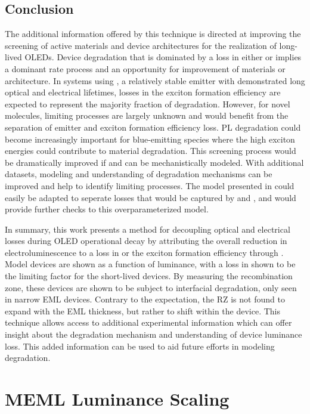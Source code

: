 \documentclass[../thesis.tex]{subfiles}
\begin{document}
\subsection{Conclusion}

The additional information offered by this technique is directed at improving the screening of active materials and device architectures for the realization of long-lived OLEDs.  
Device degradation that is dominated by a loss in either \ef  or \pl implies a dominant rate process and an opportunity for improvement of materials or architecture.  
In systems using \irppy, a relatively stable emitter with demonstrated long optical and electrical lifetimes,\supercite{Scholz2015} losses in the exciton formation efficiency are expected to represent the majority fraction of degradation.  
However, for novel molecules, limiting processes are largely unknown and would benefit from the separation of emitter and exciton formation efficiency loss.  
PL degradation could become increasingly important for blue-emitting species where the high exciton energies could contribute to material degradation.  \supercite{Scholz2015,Xu2016,Coburn2016a,Lee2015,Yi2016,Kim2008}
This screening process would be dramatically improved if \ef and \pl can be mechanistically modeled.  
With additional datasets, modeling and understanding of degradation mechanisms can be improved and help to identify limiting processes.
The model presented in \textcite{Giebink2008a} could easily be adapted to seperate losses that would be captured by \pl and \ef, and would provide further checks to this overparameterized model.

In summary, this work presents a method for decoupling optical and electrical losses during OLED operational decay by attributing the overall reduction in electroluminescence to a loss in \pl or the exciton formation efficiency through \ef.  
Model devices are shown as a function of luminance, with a loss in \ef shown to be the limiting factor for the short-lived devices.  
By measuring the recombination zone, these devices are shown to be subject to interfacial degradation, only seen in narrow EML devices.
Contrary to the expectation, the RZ is not found to expand with the EML thickness, but rather to shift within the device.
This technique allows access to additional experimental information which can offer insight about the degradation mechanism and understanding of device luminance loss.  
This added information can be used to aid future efforts in modeling degradation.

\section{MEML Luminance Scaling}\label{sec:lifetime_meml}
\end{document}
